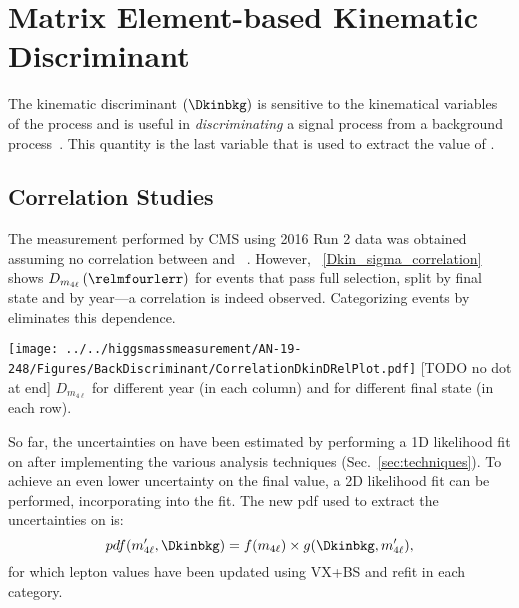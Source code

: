 \section{Matrix Element-based Kinematic Discriminant}
\label{sec:Dkin}
The kinematic discriminant $\left( \Dkinbkg \right)$ is sensitive to the kinematical variables of the \qqggzzfourl process and is useful in \emph{discriminating} a signal process from a background process~\cite{HIG_19_001}.
This quantity is the last variable that is used to extract the value of \mH.


\subsection{Correlation Studies}
\label{sec:DkinCorrelation}
The \mH measurement performed by CMS using 2016 Run 2 data was obtained assuming no correlation between \relmfourlerrflat and \Dkinbkg~\cite{HIG_16_041}.
However, \figurename~\ref{Dkin_sigma_correlation} shows $D_{m_{4\ell}} \left( \relmfourlerr \right)$ \vs \Dkinbkg for events that pass full selection, split by final state and by year---a correlation is indeed observed.
Categorizing events by \relmfourlerrflat eliminates this dependence.
\begin{multiFigure}
	\centering
		\texttt{[image: ../../higgsmassmeasurement/AN-19-248/Figures/BackDiscriminant/CorrelationDkinDRelPlot.pdf]}
		[TODO no dot at end]
		{$D_{m_{4\ell}}$ \vs \Dkinbkg for different year (in each column) and for different final state (in each row).}
	\label{Dkin_sigma_correlation}
\end{multiFigure}

So far, the uncertainties on \mH have been estimated by performing a 1D likelihood fit on \mfourl after implementing the various analysis techniques (Sec.~\ref{sec:techniques}).
To achieve an even lower uncertainty on the final \mH value, a 2D likelihood fit can be performed, incorporating \Dkinbkg into the fit.
The new pdf used to extract the uncertainties on \mH is:
\[
pdf(m'_{4\ell}, \Dkinbkg) = f(m_{4\ell}) \times g(\Dkinbkg, m'_{4\ell}),
\]
for which lepton \pt values have been updated using VX+BS and \Zone refit in each category.

